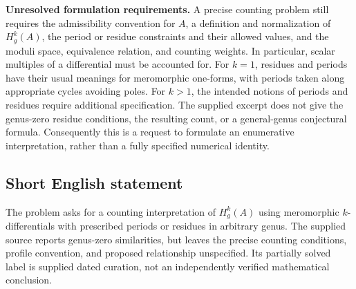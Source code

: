 \documentclass[11pt]{article}
\begin{document}
\textbf{Unresolved formulation requirements.} A precise counting problem still requires the admissibility convention for \(A\), a definition and normalization of \(H_g^k(A)\), the period or residue constraints and their allowed values, and the moduli space, equivalence relation, and counting weights. In particular, scalar multiples of a differential must be accounted for. For \(k=1\), residues and periods have their usual meanings for meromorphic one-forms, with periods taken along appropriate cycles avoiding poles. For \(k>1\), the intended notions of periods and residues require additional specification. The supplied excerpt does not give the genus-zero residue conditions, the resulting count, or a general-genus conjectural formula. Consequently this is a request to formulate an enumerative interpretation, rather than a fully specified numerical identity.
\subsection{Short English statement}
The problem asks for a counting interpretation of \(H_g^k(A)\) using meromorphic \(k\)-differentials with prescribed periods or residues in arbitrary genus. The supplied source reports genus-zero similarities, but leaves the precise counting conditions, profile convention, and proposed relationship unspecified. Its partially solved label is supplied dated curation, not an independently verified mathematical conclusion.
\end{document}
